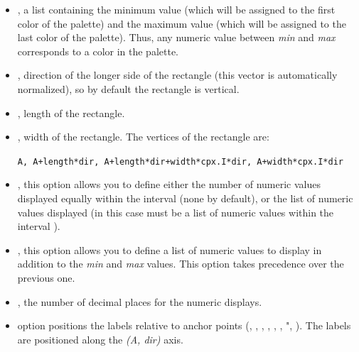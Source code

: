 \begin{itemize}
    \item {}, a list containing the minimum value (which will be assigned to the first color of the palette) and the maximum value (which will be assigned to the last color of the palette). Thus, any numeric value between \emph{min} and \emph{max} corresponds to a color in the palette.

    \item {}, direction of the longer side of the rectangle (this vector is automatically normalized), so by default the rectangle is vertical.

    \item {}, length of the rectangle.

    \item {}, width of the rectangle. The vertices of the rectangle are:\par
\hfil\verb|A, A+length*dir, A+length*dir+width*cpx.I*dir, A+width*cpx.I*dir|\hfil\par

    \item {}, this option allows you to define either the number of numeric values ​​displayed equally within the interval  (none by default), or the list of numeric values ​​displayed (in this case  must be a list of numeric values ​​within the interval ).

    \item {}, this option allows you to define a list of numeric values ​​to display in addition to the \emph{min} and \emph{max} values. This option takes precedence over the previous one.

    \item {}, the number of decimal places for the numeric displays.

    \item {} option positions the labels relative to anchor points (, , , , , , ", ). The labels are positioned along the \emph{(A, dir)} axis.
\end{itemize}


